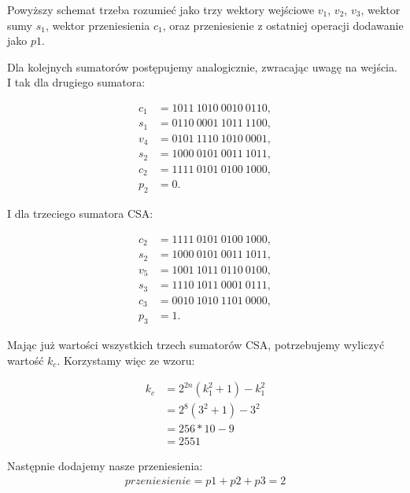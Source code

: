 \documentclass[comsoc]{IEEEtran}
\begin{document}
	Powyższy schemat trzeba rozumieć jako trzy wektory wejściowe $v_{1}$, $v_{2}$, $v_{3}$, wektor sumy $s_{1}$, wektor przeniesienia $c_{1}$, oraz przeniesienie z ostatniej operacji dodawanie jako $p1$.
	
	Dla kolejnych sumatorów postępujemy analogicznie, zwracając uwagę na wejścia. I tak dla drugiego sumatora:
	
	\begin{equation} \label{eq:csa3}
	\begin{aligned}
	c_{1}& = 1011~1010~0010~0110,\\
	s_{1}& = 0110~0001~1011~1100,\\
	v_{4}& = 0101~1110~1010~0001,\\
	s_{2}& = 1000~0101~0011~1011,\\
	c_{2}& = 1111~0101~0100~1000,\\
	p_{2}& = 0.
	\end{aligned}
	\end{equation}
	
	I dla trzeciego sumatora CSA:
	
	\begin{equation} \label{eq:csa4}
	\begin{aligned}
	c_{2}& = 1111~0101~0100~1000,\\
	s_{2}& = 1000~0101~0011~1011,\\
	v_{5}& = 1001~1011~0110~0100,\\
	s_{3}& = 1110~1011~0001~0111,\\
	c_{3}& = 0010~1010~1101~0000,\\
	p_{3}& = 1.
	\end{aligned}
	\end{equation}
	
	Mając już wartości wszystkich trzech sumatorów CSA, potrzebujemy wyliczyć wartość $k_{c}$. Korzystamy więc ze wzoru:
	
	\begin{equation} \label{eq:kc}
	\begin{aligned}
	k_{c}{}& = 2^{2n}(k_{1}^{2} + 1) - k_{1}^{2}\\& = 2^{8}(3^{2}+1)-3^{2}\\&=256*10-9\\&=2551
	\end{aligned}
	\end{equation}
	
	Następnie dodajemy nasze przeniesienia:
	\begin{equation} \label{eq:csa4}
	\begin{aligned}
	przeniesienie{}=p1+p2+p3=2
	\end{aligned}
	\end{equation}
	
\end{document}
